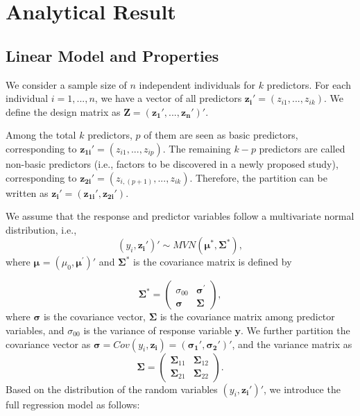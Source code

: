 \chapter{Analytical Result}
\section{Linear Model and Properties}
We consider a sample size of $n$ independent individuals for $k$ predictors. For each individual $i = 1, ..., n$, we have a vector of all predictors $\boldsymbol{z_i}' = (z_{i1},..., z_{ik})$. We define the design matrix as $\boldsymbol{Z} = (\boldsymbol{z_1}', ..., \boldsymbol{z_n}')'$.

Among the total $k$ predictors, $p$ of them are seen as basic predictors, corresponding to $\boldsymbol{z_{1i}}' = (z_{i1},..., z_{ip})$. The remaining $k-p$ predictors are called non-basic predictors (i.e., factors to be discovered in a newly proposed study), corresponding to $\boldsymbol{z_{2i}}' = (z_{i,(p+1)},..., z_{ik})$. Therefore, the partition can be written as $\boldsymbol{z_i}' = (\boldsymbol{z_{1i}}', \boldsymbol{z_{2i}}')$.

We assume that the response and predictor variables follow a multivariate normal distribution, i.e.,
$$
(y_i, \boldsymbol{z_i}')' \sim MVN(\boldsymbol{\mu^*}, \boldsymbol{\Sigma^*}),
$$
where $\boldsymbol{\mu^{}}=(\mu_{0},\boldsymbol{\mu^{'}})'$ and ${\boldsymbol{\Sigma}^*}$ is the covariance matrix is defined by

$${\boldsymbol{\Sigma}^*} = \begin{pmatrix}
\sigma_{00} & \boldsymbol{\sigma^{'}} \\
\boldsymbol{\sigma} & \boldsymbol{\Sigma}
\end{pmatrix},$$
where $\boldsymbol{\sigma}$ is the covariance vector, $\boldsymbol{\Sigma}$ is the covariance matrix among predictor variables, and $\sigma_{00}$ is the variance of response variable $\bm y$. 
We further partition the covariance vector as $\boldsymbol{\sigma} = Cov(y_i, \boldsymbol{z_i}) = (\boldsymbol{\sigma_1}', \boldsymbol{\sigma_2}')'$, 
and the variance matrix as
$${\boldsymbol{\Sigma}} =
\begin{pmatrix}
{\boldsymbol{\Sigma}_{11}} & {\boldsymbol{\Sigma}_{12}} \\
{\boldsymbol{\Sigma}_{21}} & {\boldsymbol{\Sigma}_{22}}
\end{pmatrix}.$$
Based on the distribution of the random variables $(y_i, \boldsymbol{z_i}')'$, we introduce the full regression model as follows:
 
